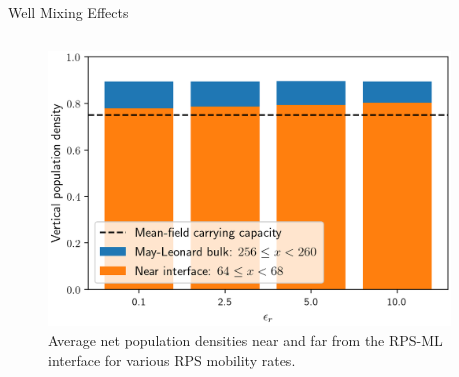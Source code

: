 \documentclass[aspectratio=169]{beamer}
\begin{document}


    \begin{frame}[t]{Well Mixing Effects}
        \begin{columns}
            \begin{column}{0.5\textwidth}
                
                \vspace{-5pt}

                \begin{figure}[h]
                    \centering
                    \hspace{-15pt}
                    \includegraphics[width=1.0\linewidth]{images/density.png}

                    \vspace{0pt}

                    \caption{Average net population densities near and far from the RPS-ML interface
                    for various RPS mobility rates.}
                \end{figure}
            \end{column}
            \begin{column}{0.5\textwidth}
                

\end{column}
\end{columns}
\end{frame}
\end{document}
